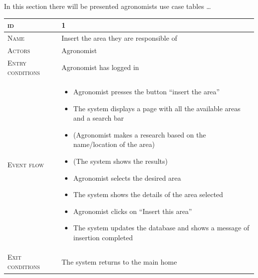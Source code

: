  In this section there will be presented agronomists use case tables \ldots
\begin{table}[H]
    \centering
    \begin{tabular}[c]{|l|p{}|}
        \hline %
    	\textsc{id}                 &   1\\
    	\hline %
    	\textsc{Name}               &   Insert the area they are responsible of\\
    	\hline %
    	\textsc{Actors}             &   Agronomist\\
    	\hline %
    	\textsc{Entry conditions}   &   Agronomist has logged in\\
    	\hline %
    	\textsc{Event flow}         &   \footnotesize
            	                        \begin{itemize}
                                    	    \item Agronomist presses the button “insert the area”
                                    		\item The system displays a page with all the available areas and a search bar
                                    		\item (Agronomist makes a research based on the name/location of the area)
                                    		\item (The system shows the results)
                                    		\item Agronomist selects the desired area
                                    		\item The system shows the details of the area selected
                                    		\item Agronomist clicks on “Insert this area”
                                    		\item The system updates the database and shows a message of insertion completed
                                        \end{itemize}\\
        \hline %
        \textsc{Exit conditions}    &  The system returns to the main home\\

\end{tabular}
\end{table}
